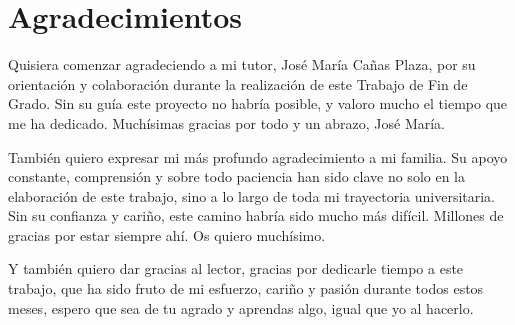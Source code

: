 \chapter*{Agradecimientos}

\noindent Quisiera comenzar agradeciendo a mi tutor, José María Cañas Plaza, por su orientación y colaboración durante la realización de este Trabajo de Fin de Grado. 
Sin su guía este proyecto no habría posible, y valoro mucho el tiempo que me ha dedicado. Muchísimas gracias por todo y un abrazo, José María.

\noindent También quiero expresar mi más profundo agradecimiento a mi familia. Su apoyo constante, comprensión y sobre todo paciencia han sido clave no solo
en la elaboración de este trabajo, sino a lo largo de toda mi trayectoria universitaria. Sin su confianza y cariño, este camino habría sido mucho más difícil. Millones de gracias por estar siempre ahí. Os quiero muchísimo.

\noindent Y también quiero dar gracias al lector, gracias por dedicarle tiempo a este trabajo, que ha sido fruto de mi esfuerzo, cariño y pasión durante todos estos meses, espero que sea de tu agrado y aprendas algo, igual que yo al hacerlo.

\vspace{2cm}



